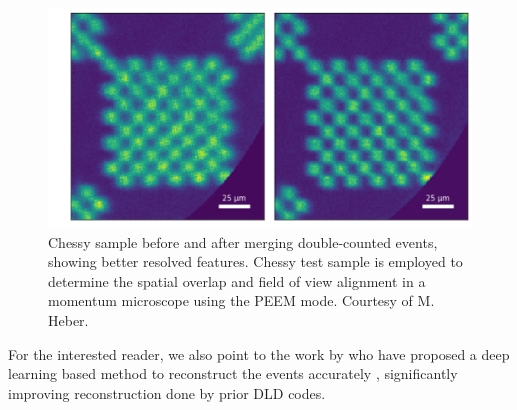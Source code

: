 \begin{figure}
    \centering
    \includegraphics[width=0.7\linewidth]{images/chessy_deblurring_merged_events.png}
    \caption{Chessy sample before and after merging double-counted events, showing better resolved features. Chessy test sample is employed to determine the spatial overlap and field of view alignment in a momentum microscope using the \gls{PEEM} mode. Courtesy of M. Heber.}
    \label{fig:chessy-distribution}
\end{figure}

For the interested reader, we also point to the work by \citeauthor{knipferDeepLearningbasedSpatiotemporal2024} who have proposed a deep learning based method to reconstruct the events accurately \cite{knipferDeepLearningbasedSpatiotemporal2024}, significantly improving reconstruction done by prior \gls{DLD} codes.